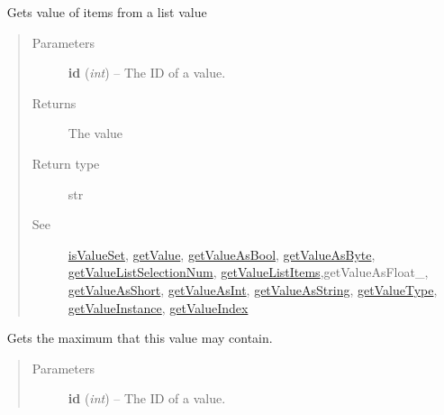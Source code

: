\documentclass[letterpaper,10pt,english]{sphinxmanual}
\begin{document}
\begin{fulllineitems}
\begin{fulllineitems}
\begin{quote}
\begin{description}
\end{description}\end{quote}

\end{fulllineitems}


\begin{fulllineitems}
\label{libopenzwave:libopenzwave.PyManager.getValueListSelectionStr}~\label{libopenzwave:getvaluelistselectionstr}
Gets value of items from a list value
\begin{quote}\begin{description}
\item[{Parameters}] \leavevmode
\textbf{id} (\emph{int}) -- The ID of a value.

\item[{Returns}] \leavevmode
The value

\item[{Return type}] \leavevmode
str

\item[{See}] \leavevmode
{\hyperref[libopenzwave:isvalueset]{isValueSet}}, {\hyperref[libopenzwave:getvalue]{getValue}}, {\hyperref[libopenzwave:getvalueasbool]{getValueAsBool}}, {\hyperref[libopenzwave:getvalueasbyte]{getValueAsByte}}, {\hyperref[libopenzwave:getvaluelistselectionnum]{getValueListSelectionNum}}, {\hyperref[libopenzwave:getvaluelistitems]{getValueListItems}},getValueAsFloat\_, {\hyperref[libopenzwave:getvalueasshort]{getValueAsShort}}, {\hyperref[libopenzwave:getvalueasint]{getValueAsInt}}, {\hyperref[libopenzwave:getvalueasstring]{getValueAsString}}, {\hyperref[libopenzwave:getvaluetype]{getValueType}}, {\hyperref[libopenzwave:getvalueinstance]{getValueInstance}}, {\hyperref[libopenzwave:getvalueindex]{getValueIndex}}

\end{description}\end{quote}

\end{fulllineitems}


\begin{fulllineitems}
\label{libopenzwave:libopenzwave.PyManager.getValueMax}~\label{libopenzwave:getvaluemax}
Gets the maximum that this value may contain.
\begin{quote}\begin{description}
\item[{Parameters}] \leavevmode
\textbf{id} (\emph{int}) -- The ID of a value.


\end{description}
\end{quote}
\end{fulllineitems}
\end{fulllineitems}
\end{document}
